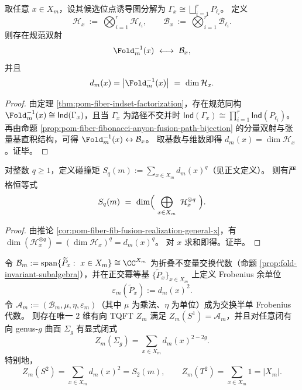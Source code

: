 \begin{corollary}[一般纤维的融合空间实现与维数恒等式]\label{cor:pom-fiber-fib-fusion-realization-general-x}
取任意 \(x\in X_m\)，设其候选位点诱导图分解为 \(\Gamma_x\cong\bigsqcup_{i=1}^r P_{\ell_i}\)。
定义
\[
\mathcal H_x\ :=\ \bigotimes_{i=1}^r \mathcal H_{\ell_i},
\qquad
\mathcal B_x\ :=\ \bigotimes_{i=1}^r \mathcal B_{\ell_i}.
\]
则存在规范双射
\[
\Fold_m^{-1}(x)\ \longleftrightarrow\ \mathcal B_x,
\]
并且
\[
d_m(x)=\bigl|\Fold_m^{-1}(x)\bigr|\ =\ \dim \mathcal H_x.
\]
\end{corollary}

\begin{proof}
由定理 \ref{thm:pom-fiber-indset-factorization}，存在规范同构 \(\Fold_m^{-1}(x)\cong \mathsf{Ind}(\Gamma_x)\)，且当 \(\Gamma_x\) 为路径不交并时
\(
\mathsf{Ind}(\Gamma_x)\cong \prod_{i=1}^r \mathsf{Ind}(P_{\ell_i})
\)。
再由命题 \ref{prop:pom-fiber-fibonacci-anyon-fusion-path-bijection} 的分量双射与张量基直积结构，可得
\(
\Fold_m^{-1}(x)\leftrightarrow \mathcal B_x
\)。
取基数与维数即得 \(d_m(x)=\dim \mathcal H_x\)。证毕。
\end{proof}

\begin{corollary}[碰撞矩的复制态融合空间读法]\label{cor:pom-collision-moments-replica-fusion-space}
对整数 \(q\ge 1\)，定义碰撞矩 \(S_q(m):=\sum_{x\in X_m}d_m(x)^q\)（见正文定义）。
则有严格恒等式
\[
S_q(m)\ =\ \dim\Bigl(\ \bigoplus_{x\in X_m}\ \mathcal H_x^{\otimes q}\ \Bigr).
\]
\end{corollary}

\begin{proof}
由推论 \ref{cor:pom-fiber-fib-fusion-realization-general-x}，有 \(\dim(\mathcal H_x^{\otimes q})=(\dim\mathcal H_x)^q=d_m(x)^q\)。
对 \(x\) 求和即得。证毕。
\end{proof}

\begin{theorem}\label{thm:pom-fold-groupoid-2d-tqft-partition}
令 \(\mathcal B_m:=\mathrm{span}\{\widetilde P_x:\ x\in X_m\}\cong \CC^{X_m}\) 为折叠不变量交换代数（命题 \ref{prop:fold-invariant-subalgebra}），并在正交幂等基 \(\{\widetilde P_x\}_{x\in X_m}\) 上定义 Frobenius 余单位
\[
\varepsilon_m(\widetilde P_x):=d_m(x)^2.
\]
令 \(\mathcal A_m:=(\mathcal B_m,\mu,\eta,\varepsilon_m)\)（其中 \(\mu\) 为乘法、\(\eta\) 为单位）成为交换半单 Frobenius 代数。
则存在唯一 \(2\) 维有向 TQFT \(Z_m\) 满足 \(Z_m(S^1)=\mathcal A_m\)，并且对任意闭有向 genus-\(g\) 曲面 \(\Sigma_g\) 有显式闭式
\[
Z_m(\Sigma_g)=\sum_{x\in X_m} d_m(x)^{2-2g}.
\]
特别地，
\[
Z_m(S^2)=\sum_{x\in X_m}d_m(x)^2=S_2(m),
\qquad
Z_m(T^2)=\sum_{x\in X_m}1=|X_m|.
\]
\end{theorem}

